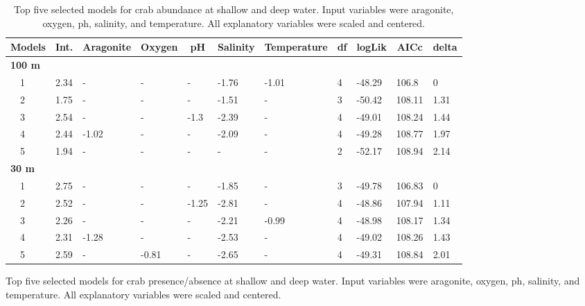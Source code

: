 \documentclass[letterpaper,12pt]{article}\usepackage[]{graphicx}\usepackage[]{color}
\begin{document}
\begin{landscape}
\centering\vspace*{\fill}
\begin{table}[!tbp]
{\scriptsize
\caption{Top five selected models for crab abundance at shallow and deep water. Input variables were aragonite, oxygen, ph, salinity, and temperature. All explanatory variables were scaled and centered.\label{tab:abutab}} 
\begin{center}
\begin{tabular}{lllllllllll}
\hline\hline
\multicolumn{1}{l}{Models}&\multicolumn{1}{c}{Int.}&\multicolumn{1}{c}{Aragonite}&\multicolumn{1}{c}{Oxygen}&\multicolumn{1}{c}{pH}&\multicolumn{1}{c}{Salinity}&\multicolumn{1}{c}{Temperature}&\multicolumn{1}{c}{df}&\multicolumn{1}{c}{logLik}&\multicolumn{1}{c}{AICc}&\multicolumn{1}{c}{delta}\tabularnewline
\hline
{\bfseries 100 m}&&&&&&&&&&\tabularnewline
~~1&2.34&-&-&-&-1.76&-1.01&4&-48.29&106.8&0\tabularnewline
~~2&1.75&-&-&-&-1.51&-&3&-50.42&108.11&1.31\tabularnewline
~~3&2.54&-&-&-1.3&-2.39&-&4&-49.01&108.24&1.44\tabularnewline
~~4&2.44&-1.02&-&-&-2.09&-&4&-49.28&108.77&1.97\tabularnewline
~~5&1.94&-&-&-&-&-&2&-52.17&108.94&2.14\tabularnewline
\hline
{\bfseries 30 m}&&&&&&&&&&\tabularnewline
~~1&2.75&-&-&-&-1.85&-&3&-49.78&106.83&0\tabularnewline
~~2&2.52&-&-&-1.25&-2.81&-&4&-48.86&107.94&1.11\tabularnewline
~~3&2.26&-&-&-&-2.21&-0.99&4&-48.98&108.17&1.34\tabularnewline
~~4&2.31&-1.28&-&-&-2.53&-&4&-49.02&108.26&1.43\tabularnewline
~~5&2.59&-&-0.81&-&-2.65&-&4&-49.31&108.84&2.01\tabularnewline
\hline
\end{tabular}\end{center}}
\end{table}
\begin{table}[!tbp]
{\scriptsize
\caption{Top five selected models for crab presence/absence at shallow and deep water. Input variables were aragonite, oxygen, ph, salinity, and temperature. All explanatory variables were scaled and centered.\label{tab:patab}} 
\begin{center}

\end{center}}
\end{table}
\end{landscape}
\end{document}
